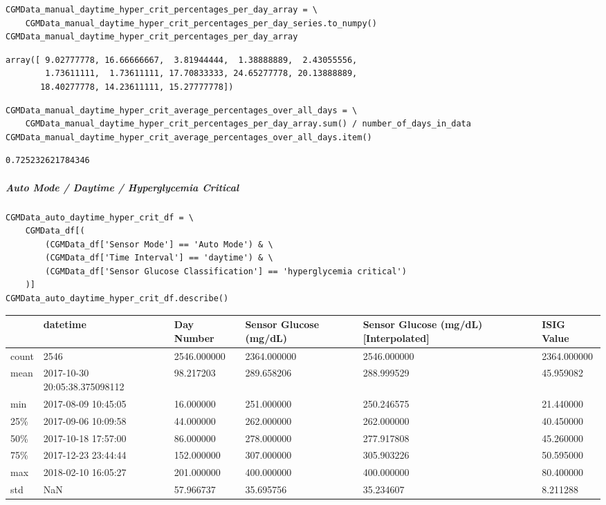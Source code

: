 \begin{verbatim}
CGMData_manual_daytime_hyper_crit_percentages_per_day_array = \
    CGMData_manual_daytime_hyper_crit_percentages_per_day_series.to_numpy()
CGMData_manual_daytime_hyper_crit_percentages_per_day_array
\end{verbatim}

\begin{verbatim}
array([ 9.02777778, 16.66666667,  3.81944444,  1.38888889,  2.43055556,
        1.73611111,  1.73611111, 17.70833333, 24.65277778, 20.13888889,
       18.40277778, 14.23611111, 15.27777778])
\end{verbatim}

\begin{verbatim}
CGMData_manual_daytime_hyper_crit_average_percentages_over_all_days = \
    CGMData_manual_daytime_hyper_crit_percentages_per_day_array.sum() / number_of_days_in_data
CGMData_manual_daytime_hyper_crit_average_percentages_over_all_days.item()
\end{verbatim}

\begin{verbatim}
0.725232621784346
\end{verbatim}

\subparagraph{Auto Mode / Daytime / Hyperglycemia Critical}

\begin{verbatim}
CGMData_auto_daytime_hyper_crit_df = \
    CGMData_df[(
        (CGMData_df['Sensor Mode'] == 'Auto Mode') & \
        (CGMData_df['Time Interval'] == 'daytime') & \
        (CGMData_df['Sensor Glucose Classification'] == 'hyperglycemia critical')
    )]
CGMData_auto_daytime_hyper_crit_df.describe()
\end{verbatim}

\bigskip\noindent
\begin{tabular}{p{}p{}p{}p{}p{}p{}}
\toprule
 & datetime & Day Number & Sensor Glucose (mg/dL) & Sensor Glucose (mg/dL) [Interpolated] & ISIG Value \\
\hline
count & 2546 & 2546.000000 & 2364.000000 & 2546.000000 & 2364.000000 \\
\hline
mean & 2017-10-30 20:05:38.375098112 & 98.217203 & 289.658206 & 288.999529 & 45.959082 \\
\hline
min & 2017-08-09 10:45:05 & 16.000000 & 251.000000 & 250.246575 & 21.440000 \\
\hline
25\% & 2017-09-06 10:09:58 & 44.000000 & 262.000000 & 262.000000 & 40.450000 \\
\hline
50\% & 2017-10-18 17:57:00 & 86.000000 & 278.000000 & 277.917808 & 45.260000 \\
\hline
75\% & 2017-12-23 23:44:44 & 152.000000 & 307.000000 & 305.903226 & 50.595000 \\
\hline
max & 2018-02-10 16:05:27 & 201.000000 & 400.000000 & 400.000000 & 80.400000 \\
\hline
std & NaN & 57.966737 & 35.695756 & 35.234607 & 8.211288 \\
\hline
\bottomrule
\end{tabular}

